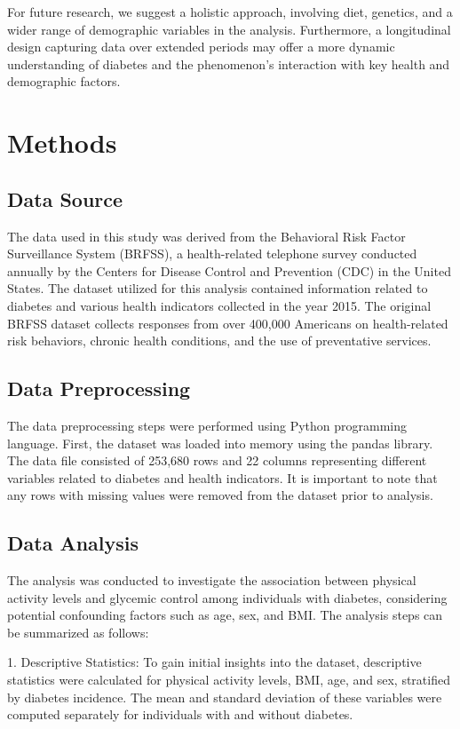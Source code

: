 \documentclass[11pt]{article}
\begin{document}
For future research, we suggest a holistic approach, involving diet, genetics, and a wider range of demographic variables in the analysis. Furthermore, a longitudinal design capturing data over extended periods may offer a more dynamic understanding of diabetes and the phenomenon's interaction with key health and demographic factors.

\section*{Methods}

\subsection*{Data Source}
The data used in this study was derived from the Behavioral Risk Factor Surveillance System (BRFSS), a health-related telephone survey conducted annually by the Centers for Disease Control and Prevention (CDC) in the United States. The dataset utilized for this analysis contained information related to diabetes and various health indicators collected in the year 2015. The original BRFSS dataset collects responses from over 400,000 Americans on health-related risk behaviors, chronic health conditions, and the use of preventative services.

\subsection*{Data Preprocessing}
The data preprocessing steps were performed using Python programming language. First, the dataset was loaded into memory using the pandas library. The data file consisted of 253,680 rows and 22 columns representing different variables related to diabetes and health indicators. It is important to note that any rows with missing values were removed from the dataset prior to analysis.

\subsection*{Data Analysis}
The analysis was conducted to investigate the association between physical activity levels and glycemic control among individuals with diabetes, considering potential confounding factors such as age, sex, and BMI. The analysis steps can be summarized as follows:

1. Descriptive Statistics: To gain initial insights into the dataset, descriptive statistics were calculated for physical activity levels, BMI, age, and sex, stratified by diabetes incidence. The mean and standard deviation of these variables were computed separately for individuals with and without diabetes.
\end{document}

